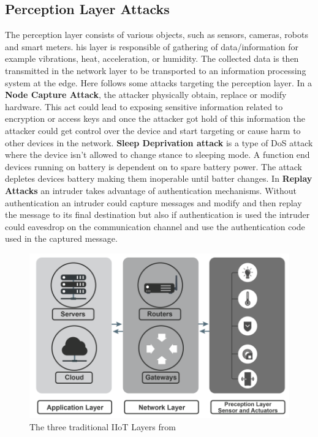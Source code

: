 \documentclass[article,a4paper]{IEEEtran}
\begin{document}
\subsection{Perception Layer Attacks}
The perception layer consists of various objects, such as sensors, cameras, robots and smart meters. his layer is responsible of gathering of data/information for example vibrations, heat, acceleration, or humidity. The collected data is then transmitted in the network layer to be transported to an information processing system at the edge. Here follows some attacks targeting the perception layer.
\newline\newline
In a \textbf{Node Capture Attack}, the attacker physically obtain, replace or modify hardware. This act could lead to exposing sensitive information related to encryption or access keys and once the attacker got hold of this information the attacker could get control over the device and start targeting or cause harm to other devices in the network. 
\newline
\textbf{Sleep Deprivation attack} is a type of DoS attack where the device isn't allowed to change stance to sleeping mode. A function end devices running on battery is dependent on to spare battery power. The attack depletes devices battery making them inoperable until batter changes. 
\newline
In \textbf{Replay Attacks} an intruder takes advantage of authentication mechanisms. Without authentication an intruder could capture messages and modify and then replay the message to its final destination but also if authentication is used the intruder could eavesdrop on the communication channel and use the authentication code used in the captured message. 
\begin{figure}
    \includegraphics[width=\columnwidth]{LayersIIoT.png}
    \caption{ The three traditional IIoT Layers from \cite{SurveySecurity} }
    \label{fig1: IIoT layers }
\end{figure}
\end{document}
